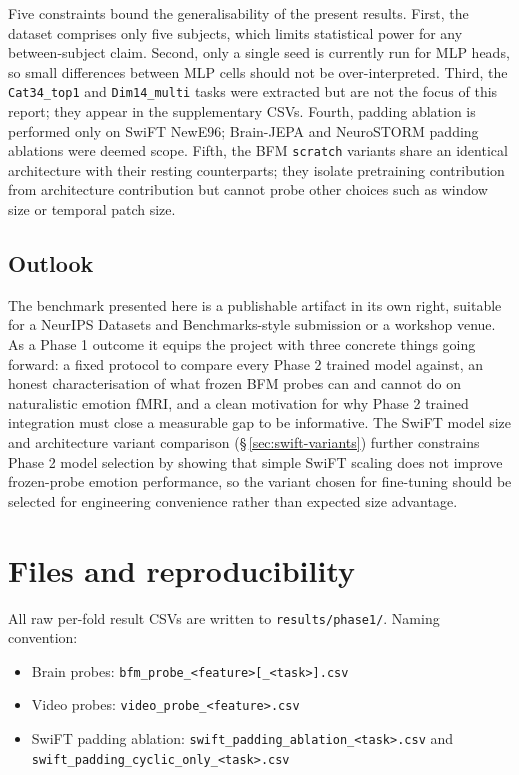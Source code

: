 \documentclass[11pt, a4paper]{article}
\newcommand{\fefn}[1]{\texttt{\small #1}}
\begin{document}
Five constraints bound the generalisability of the present results. First, the dataset
comprises only five subjects, which limits statistical power for any between-subject
claim. Second, only a single seed is currently run for MLP heads, so small differences
between MLP cells should not be over-interpreted. Third, the \texttt{Cat34\_top1} and
\texttt{Dim14\_multi} tasks were extracted but are not the focus of this report; they
appear in the supplementary CSVs. Fourth, padding ablation is performed only on SwiFT
NewE96; Brain-JEPA and NeuroSTORM padding ablations were deemed scope. Fifth, the BFM
\texttt{scratch} variants share an identical architecture with their resting counterparts;
they isolate pretraining contribution from architecture contribution but cannot probe
other choices such as window size or temporal patch size.

\subsection{Outlook}

The benchmark presented here is a publishable artifact in its own right, suitable for a
NeurIPS Datasets and Benchmarks-style submission or a workshop venue. As a Phase 1
outcome it equips the project with three concrete things going forward: a fixed protocol
to compare every Phase 2 trained model against, an honest characterisation of what frozen
BFM probes can and cannot do on naturalistic emotion fMRI, and a clean motivation for
why Phase 2 trained integration must close a measurable gap to be informative. The SwiFT
model size and architecture variant comparison (\S\,\ref{sec:swift-variants}) further
constrains Phase 2 model selection by showing that simple SwiFT scaling does not improve
frozen-probe emotion performance, so the variant chosen for fine-tuning should be selected
for engineering convenience rather than expected size advantage.

\appendix

\section{Files and reproducibility}

All raw per-fold result CSVs are written to \fefn{results/phase1/}. Naming convention:

\begin{itemize}[leftmargin=1.4em, itemsep=1pt]
  \item Brain probes: \fefn{bfm\_probe\_<feature>[\_<task>].csv}
  \item Video probes: \fefn{video\_probe\_<feature>.csv}
  \item SwiFT padding ablation: \fefn{swift\_padding\_ablation\_<task>.csv}
        and \fefn{swift\_padding\_cyclic\_only\_<task>.csv}
\end{itemize}
\end{document}

